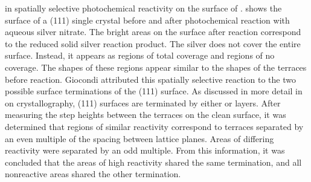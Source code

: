 in spatially selective photochemical reactivity on the surface of .
 shows the surface of a (111)  single crystal before and
after photochemical reaction with aqueous silver nitrate. The bright areas on the surface
after reaction correspond to the reduced solid silver reaction product. The silver does
not cover the entire surface. Instead, it appears as regions of total coverage and regions
of no coverage. The shapes of these regions appear similar to the shapes of the terraces
before reaction. Giocondi attributed this spatially selective reaction to the two possible
surface terminations of the (111)  surface. As discussed in more detail in
 on  crystallography, (111) 
surfaces are terminated by either  or  layers. After measuring
the step heights between the terraces on the clean surface, it was determined that regions
of similar reactivity correspond to terraces separated by an even multiple of the spacing
between lattice planes. Areas of differing reactivity were separated by an odd multiple.
From this information, it was concluded that the areas of high reactivity shared the same
termination, and all nonreactive areas shared the other termination.

